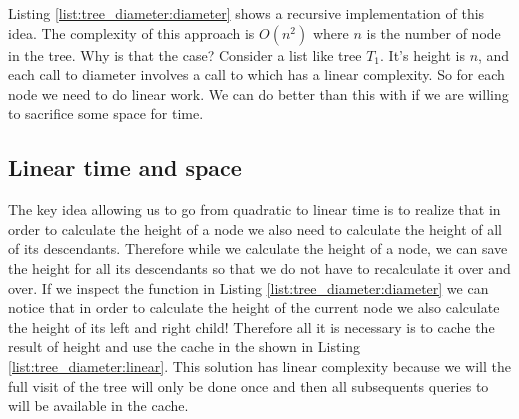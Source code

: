 Listing \ref{list:tree_diameter:diameter} shows a recursive implementation of this idea. The complexity of this approach is $O(n^2)$ where $n$ is the number of node in the tree. Why is that the case? Consider a list like tree $T_1$. It's height is $n$, and each call to diameter involves a call to  which has a linear complexity. So for each node we need to do linear work. We can do better than this with if we are willing to sacrifice some space for time. 



\subsection{Linear time and space}
\label{tree_diameter:sec:linear}
The key idea allowing us to go from quadratic to linear time is to realize that in order to calculate the height of a node we also need to calculate the height of all of its descendants. Therefore while we calculate the height of a node, we can save the height for all its descendants so that we do not have to recalculate it over and over. If we inspect the function  in Listing \ref{list:tree_diameter:diameter} we can notice that in order to calculate the height of the current node we also calculate the height of its left and right child!
Therefore all it is necessary is to cache the result of height and use the cache in the shown in Listing \ref{list:tree_diameter:linear}. This solution has linear complexity because we will the full visit of the tree will only be done once and then all subsequents queries to  will be available in the cache. 



